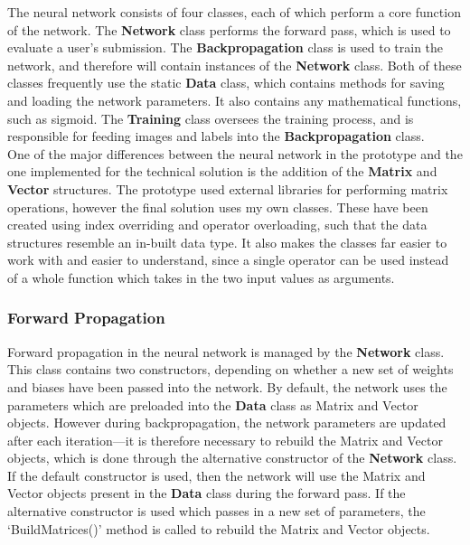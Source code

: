 \documentclass{article}
\begin{document}
The neural network consists of four classes, each of which perform a core function of the network. The \textbf{Network} class performs the forward pass, which is used to evaluate a user's submission. The \textbf{Backpropagation} class is used to train the network, and therefore will contain instances of the \textbf{Network} class. Both of these classes frequently use the static \textbf{Data} class, which contains methods for saving and loading the network parameters. It also contains any mathematical functions, such as sigmoid. The \textbf{Training} class oversees the training process, and is responsible for feeding images and labels into the \textbf{Backpropagation} class. \\

One of the major differences between the neural network in the prototype and the one implemented for the technical solution is the addition of the \textbf{Matrix} and \textbf{Vector} structures. The prototype used external libraries for performing matrix operations, however the final solution uses my own classes. These have been created using index overriding and operator overloading, such that the data structures resemble an in-built data type. It also makes the classes far easier to work with and easier to understand, since a single operator can be used instead of a whole function which takes in the two input values as arguments.

\subsubsection{Forward Propagation}

Forward propagation in the neural network is managed by the \textbf{Network} class. This class contains two constructors, depending on whether a new set of weights and biases have been passed into the network. By default, the network uses the parameters which are preloaded into the \textbf{Data} class as Matrix and Vector objects. However during backpropagation, the network parameters are updated after each iteration---it is therefore necessary to rebuild the Matrix and Vector objects, which is done through the alternative constructor of the \textbf{Network} class. \\

If the default constructor is used, then the network will use the Matrix and Vector objects present in the \textbf{Data} class during the forward pass. If the alternative constructor is used which passes in a new set of parameters, the `BuildMatrices()' method is called to rebuild the Matrix and Vector objects. \\
\end{document}
